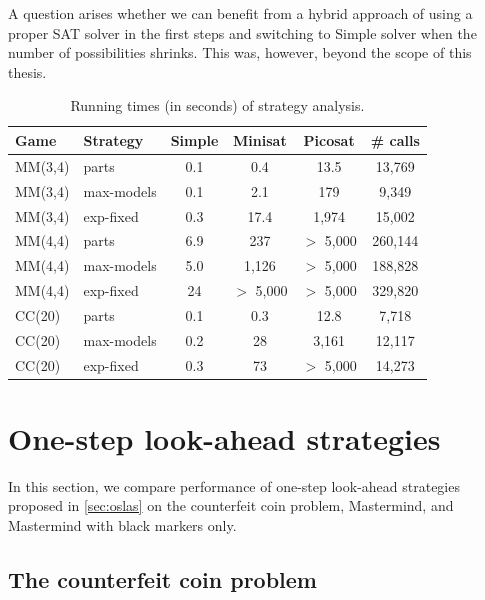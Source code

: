 A question arises whether we can benefit from a hybrid approach of
  using a proper SAT solver in the first steps and
  switching to Simple solver when the number of possibilities shrinks.
This was, however, beyond the scope of this thesis.

\begin{table}
\begin{center}
\begin{tabular}{|l|l|c|c|c|c|} \hline
Game & Strategy& Simple & Minisat & Picosat & \# calls \\ \hline
MM(3,4) & parts & 0.1 & 0.4 & 13.5 & 13,769 \\
MM(3,4) & max-models & 0.1 & 2.1 & 179 & 9,349 \\
MM(3,4) & exp-fixed & 0.3 & 17.4 & 1,974 & 15,002 \\
MM(4,4) & parts & 6.9 & 237 & $>$ 5,000 & 260,144 \\
MM(4,4) & max-models & 5.0 & 1,126 & $>$ 5,000 & 188,828 \\
MM(4,4) & exp-fixed & 24 & $>$ 5,000 & $>$ 5,000 & 329,820 \\
CC(20) & parts & 0.1 & 0.3 & 12.8 & 7,718 \\
CC(20) & max-models & 0.2 & 28 & 3,161 & 12,117 \\
CC(20) & exp-fixed & 0.3 & 73 & $>$ 5,000 & 14,273 \\\hline
\end{tabular}
\caption{Running times (in seconds) of strategy analysis.}
\label{tbl:exp-sat-analyse}
\end{center}
\end{table}


\section{One-step look-ahead strategies}

In this section, we compare performance of one-step look-ahead strategies
proposed in \autoref{sec:oslas} on the counterfeit coin problem,
Mastermind, and Mastermind with black markers only.

\subsection{The counterfeit coin problem}

